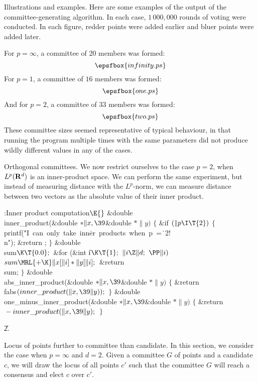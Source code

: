 Illustrations and examples.
Here are some examples of the output of the committee-generating algorithm. In
each case, $1\,000,000$
rounds of voting were conducted. In each figure, redder points were added
earlier and bluer points were
added later.

For $p=\infty$, a committee of 20 members was formed:
$$\epsfbox{infinity.ps}$$
For $p=1$, a committee of $16$ members was formed:
$$\epsfbox{one.ps}$$
And for $p=2$, a committee of $33$ members was formed:
$$\epsfbox{two.ps}$$
These committee sizes seemed representative of typical behaviour, in that
running the program multiple times
with the same parameters did not produce wildly different values in any of the
cases.

\fi

Orthogonal committees.
We now restrict ourselves to the case $p = 2$, when $L^p({\bf R}^d)$ is an
inner-product space. We can perform
the same experiment, but instead of measuring distance with the $L^p$-norm, we
can measure distance
between two vectors as the absolute value of their inner product.

\Y\B\4:Inner product computation\X${}\E{}$\6
\&{double} \\{inner\_product}(\&{double} ${}{*}\|x,\39{}$\&{double} ${}{*}%
\|y){}$\1\1\2\2\6
${}\{{}$\1\6
\&{if} ${}(\|p\I\T{2}){}$\5
${}\{{}$\1\6
\\{printf}(\.{"I\ can\ only\ take\ inn}\)\.{er\ products\ when\ p\ =}\)\.{\ 2!%
\\n"});\6
\&{return} ;\6
\4${}\}{}$\2\7
\&{double} \\{sum}${}\K\T{0.0};{}$\7
\&{for} (\&{int} \|i${}\K\T{1};{}$ ${}\|i\Z\|d;{}$ ${}\PP\|i){}$\1\5
${}\\{sum}\MRL{+{\K}}\|x[\|i]*\|y[\|i];{}$\2\6
\&{return} \\{sum};\6
\4${}\}{}$\2\7
\&{double} \\{abs\_inner\_product}(\&{double} ${}{*}\|x,\39{}$\&{double} ${}{*}%
\|y){}$\1\1\2\2\6
${}\{{}$\1\6
\&{return} \\{fabs}${}(\\{inner\_product}(\|x,\39\|y));{}$\6
\4${}\}{}$\2\7
\&{double} \\{one\_minus\_inner\_product}(\&{double} ${}{*}\|x,\39{}$\&{double}
${}{*}\|y){}$\1\1\2\2\6
${}\{{}$\1\6
\&{return} ${}-\\{inner\_product}(\|x,\39\|y);{}$\6
\4${}\}{}$\2\par
\U2.\fi

Locus of points further to committee than candidate.
In this section, we consider the case when $p=\infty$ and $d=2$. Given a
committee $G$ of points and a candidate
$c$, we will draw the locus of all points $c'$ such that the committee $G$ will
reach a consensus and elect
$c$ over $c'$.

